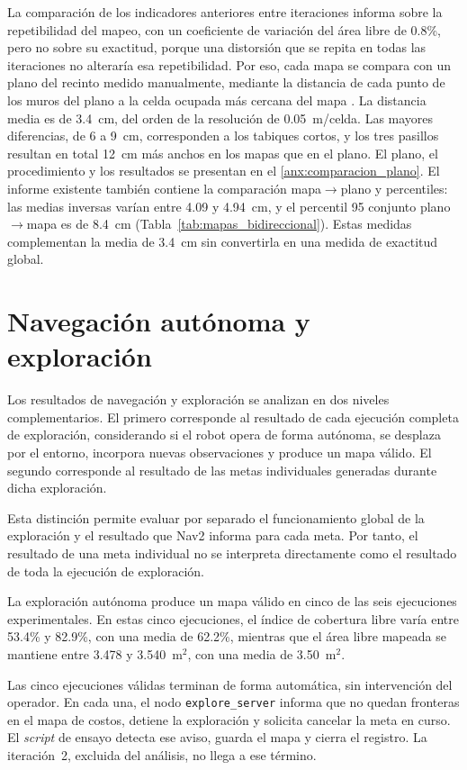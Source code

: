 La comparación de los indicadores anteriores entre iteraciones informa sobre
la repetibilidad del mapeo, con un coeficiente de variación del área libre de
0.8\%, pero no sobre su exactitud, porque una distorsión que se repita en todas
las iteraciones no alteraría esa repetibilidad. Por eso, cada mapa se compara
con un plano del recinto medido manualmente, mediante la distancia de cada
punto de los muros del plano a la celda ocupada más cercana del mapa
\citep{trejos2022slam}. La distancia media es de 3.4~cm,
del orden de la resolución de 0.05~m/celda. Las mayores diferencias, de 6 a
9~cm, corresponden a los tabiques cortos, y los tres pasillos resultan en total
12~cm más anchos en los mapas que en el plano. El plano, el procedimiento y los
resultados se presentan en el \ref{anx:comparacion_plano}. El informe
existente también contiene la comparación mapa$\to$plano y percentiles:
las medias inversas varían entre 4.09 y 4.94~cm, y el percentil 95 conjunto
plano$\to$mapa es de 8.4~cm (Tabla~\ref{tab:mapas_bidireccional}). Estas
medidas complementan la media de 3.4~cm sin convertirla en una medida de
exactitud global.

\section{Navegación autónoma y exploración}
\label{sec:resultados_nav2}

Los resultados de navegación y exploración se analizan en dos niveles
complementarios. El primero corresponde al resultado de cada ejecución completa
de exploración, considerando si el robot opera de forma autónoma, se desplaza
por el entorno, incorpora nuevas observaciones y produce un mapa válido. El
segundo corresponde al resultado de las metas individuales generadas durante
dicha exploración.

Esta distinción permite evaluar por separado el funcionamiento global de la
exploración y el resultado que Nav2 informa para cada meta. Por tanto, el resultado de una meta individual no se
interpreta directamente como el resultado de toda la ejecución de exploración.

La exploración autónoma produce un mapa válido en cinco de las seis ejecuciones
experimentales. En estas cinco ejecuciones, el índice de cobertura libre varía
entre 53.4\% y 82.9\%, con una media de 62.2\%, mientras que el área libre
mapeada se mantiene entre 3.478 y 3.540~m$^2$, con una media de
3.50~m$^2$.

Las cinco ejecuciones válidas terminan de forma automática, sin intervención
del operador. En cada una, el nodo \texttt{explore\_server} informa que no
quedan fronteras en el mapa de costos, detiene la exploración y solicita
cancelar la meta en curso. El \textit{script} de ensayo detecta ese aviso, guarda el
mapa y cierra el registro. La iteración~2, excluida del análisis, no llega a ese
término.

